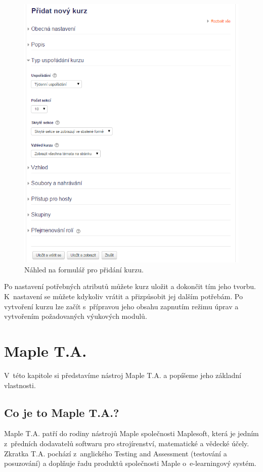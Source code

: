 \documentclass[
print,
  11pt,
  table,   
  nolof,    
  nolot,
  oneside,
  draft
]{fithesis3}
\begin{document}
		\begin{figure}
		  \begin{center}
		    \includegraphics[width=120mm]{images/kurzy-pridani-detail.png}
		   \end{center}
		  \caption{Náhled na formulář pro přidání kurzu.}
		  \label{fig:moodlekurzypridanidetail}
		\end{figure}

Po nastavení potřebných atributů můžete kurz uložit a dokončit tím jeho tvorbu. K~nastavení se můžete kdykoliv vrátit a přizpůsobit jej dalším potřebám. Po vytvoření kurzu lze začít s~přípravou jeho obsahu zapnutím režimu úprav a vytvořením požadovaných výukových modulů.


\chapter{Maple T.A.}
V~této kapitole si představíme nástroj Maple T.A. a popíšeme jeho základní vlastnosti.
	\section{Co je to Maple T.A.?}
Maple T.A. patří do rodiny nástrojů Maple společnosti Maplesoft, která je jedním z~předních dodavatelů softwaru pro strojírenství, matematické a vědecké účely. Zkratka T.A. pochází z~anglického Testing and Assessment (testování a posuzování) a doplňuje řadu produktů společnosti Maple o~e-learn\-ingový systém.
\end{document}
